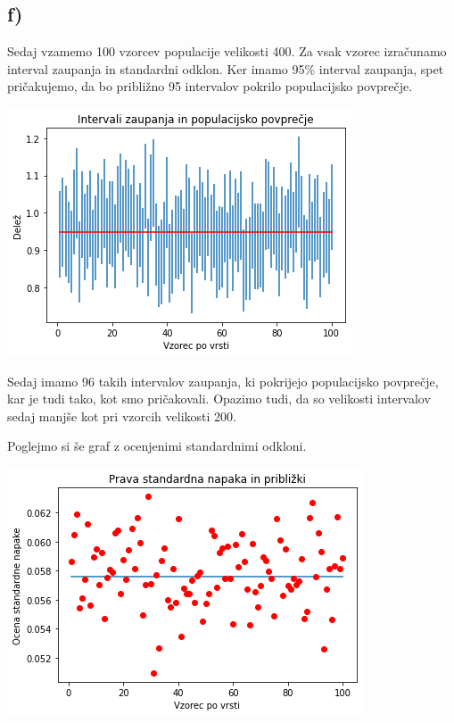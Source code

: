 \documentclass[12pt, a4paper]{article}
\begin{document}
\subsection*{f)}

Sedaj vzamemo 100 vzorcev populacije velikosti 400. Za vsak vzorec izračunamo
interval zaupanja in standardni odklon. Ker imamo 95\% interval zaupanja, spet
pričakujemo, da bo približno 95 intervalov pokrilo populacijsko povprečje.

\begin{center}
    \includegraphics[scale=0.7]{Intervali_zaupanja_400.png}
\end{center}

Sedaj imamo 96 takih intervalov zaupanja, ki pokrijejo populacijsko povprečje,
kar je tudi tako, kot smo pričakovali. Opazimo tudi, da so velikosti intervalov
sedaj manjše kot pri vzorcih velikosti 200.

Poglejmo si še graf z ocenjenimi standardnimi odkloni.

\begin{center}
    \includegraphics[scale=0.7]{St_napaka_400.png}
\end{center}
\end{document}
